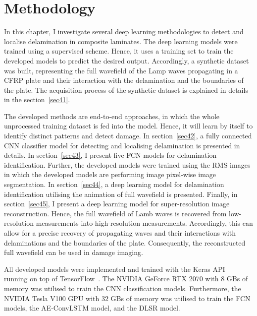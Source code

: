 \chapter[Methodology]{Methodology}
\label{ch4}

In this chapter, I investigate several deep learning methodologies to detect and localise delamination in composite laminates.
The deep learning models were trained using a supervised scheme. 
Hence, it uses a training set to train the developed models to predict the desired output.
Accordingly, a synthetic dataset was built, representing the full wavefield of the Lamp waves propagating in a CFRP plate and their interaction with the delamination and the boundaries of the plate.
The acquisition process of the synthetic dataset is explained in details in the section~\ref{sec41}.

The developed methods are end-to-end approaches, in which the whole unprocessed training dataset is fed into the model.
Hence, it will learn by itself to identify distinct patterns and detect damage.
In section~\ref{sec42}, a fully connected CNN classifier model for detecting and localising delamination is presented in details.
In section~\ref{sec43}, I present five FCN models for delamination identification. Further, the developed models were trained using the RMS images in which the developed models are performing image pixel-wise image segmentation.
In section~\ref{sec44}, a deep learning model for delamination identification utilising the animation of full wavefield is presented.
Finally, in section~\ref{sec45}, I present a deep learning model for super-resolution image reconstruction.
Hence, the full wavefield of Lamb waves is recovered from low-resolution measurements into high-resolution measurements.
Accordingly, this can allow for a precise recovery of propagating waves and their interactions with delaminations and the boundaries of the plate.
Consequently, the reconstructed full wavefield can be used in damage imaging. 


All developed models were implemented and trained with the Keras API~\cite{chollet2015keras} running on top of TensorFlow~\cite{Abadi2016}.
The NVIDIA GeForce RTX 2070 with \(8\) GBs of memory was utilised to train the CNN classification models.
Furthermore, the NVIDIA Tesla V100 GPU with \(32\) GBs of memory was utilised to train the FCN models, the AE-ConvLSTM model, and the DLSR model.







